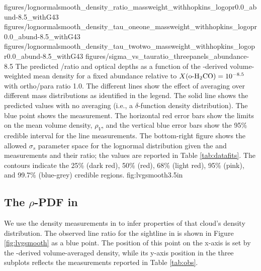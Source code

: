 \FigureFourPDF
    {figures/lognormalsmooth_density_ratio_massweight_withhopkins_logopr0.0_abund-8.5_withG43}
    {figures/lognormalsmooth_density_tau_oneone_massweight_withhopkins_logopr0.0_abund-8.5_withG43}
    {figures/lognormalsmooth_density_tau_twotwo_massweight_withhopkins_logopr0.0_abund-8.5_withG43}
    {figures/sigma_vs_tauratio_threepanels_abundance-8.5}
{The predicted \formaldehyde \oneone/\twotwo ratio and optical depths as a
function of the \thirteenco-derived volume-weighted mean density for a fixed
abundance relative to \hh $X(\textrm{o-H}_2\textrm{CO}) = 10^{-8.5}$  with \hh ortho/para ratio
1.0.  The different lines show the effect of averaging over different
mass distributions as identified in the legend. %
The solid line shows the predicted values
with no averaging (i.e., a $\delta$-function density distribution).
The blue point shows the \north measurement.  The horizontal red error bars
show the limits on the mean volume density, $\rho_V$, and the vertical blue error
bars show the 95\% credible interval for the \formaldehyde line measurements.
The bottom-right figure shows the allowed $\sigma_s$ parameter space for the
lognormal distribution given the \oneone and \twotwo measurements and their
ratio; the values are reported in Table \ref{tab:datafits}.  The contours
indicate the 25\% (dark red), 50\% (red), 68\% (light red), 95\% (pink), and 99.7\%
(blue-grey) credible regions.
}
{fig:lvgsmooth}{3.5in}

\subsection{The $\rho$-PDF in \GRSMC}
\label{sec:grsmcturb}
We use the density measurements in \GRSMC to infer properties of that
cloud's density distribution.  The observed line ratio for the \north sightline in
\GRSMC is shown in Figure \ref{fig:lvgsmooth} as a blue point.  The position
of this point on the x-axis is set by the \thirteenco-derived volume-averaged density,
while its y-axis position in the three subplots reflects the \formaldehyde measurements
reported in Table \ref{tab:obs}.

